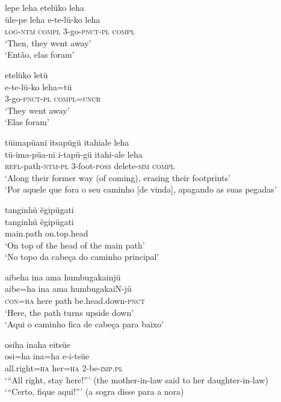 \documentclass[output=paper,
modfonts,nonflat
]{langsci/langscibook}
\begin{document}
\ea lepe leha etelüko leha \\[.3em]
\gll üle-pe leha e-te-lü-ko leha \\
\textsc{log-ntm} \textsc{compl} 3-go-\textsc{pnct-pl} \textsc{compl} \\
\glt ‘Then, they went away’\\
‘Então, elas foram’\\
\z

\ea etelüko letü \\[.3em]
\gll e-te-lü-ko leha=tü \\
3-go-\textsc{pnct-pl} \textsc{compl=uncr} \\
\glt ‘They went away’ \\
‘Elas foram’ \\
\z


\ea tüimapüani itsapügü itahiale leha \\[.3em]
\gll tü-ima-püa-ni i-tapü-gü itahi-ale leha \\
\textsc{refl}-path-\textsc{ntm-pl} 3-foot-\textsc{poss} delete-\textsc{sim} \textsc{compl} \\
\glt ‘Along their former way (of coming), erasing their footprints’ \\
‘Por aquele que fora o seu caminho [de vinda], apagando as
suas pegadas’ \\
\z

\ea tanginhü ẽgipügati{\footnotemark}{} \\[.3em]
\gll tanginhü ẽgipügati \\
main.path on.top.head \\
\glt ‘On top of the head of the main path’ \\
‘No topo da cabeça do caminho principal’ \\
\z

\ea aibeha ina ama humbugakainjü \\[.3em]
\gll aibe=ha ina ama humbugakaiN-jü \\
\textsc{con=ha} here path be.head.down\textsc{-pnct}  \\
\glt‘Here, the path turns upside down’ \\
‘Aqui o caminho fica de cabeça para baixo’ \\
\z

\ea osiha inaha eitsüe \\[.3em]
\gll osi=ha ina=ha e-i-tsüe \\
all.right=\textsc{ha} her=\textsc{ha} 2-be-\textsc{imp.pl} \\
 \glt ‘“All right, stay here!”’ (the mother-in-law said to her daughter-in-law) \\
‘“Certo, fique aqui!”’ (a sogra disse para a nora) \\
\z
\end{document}
